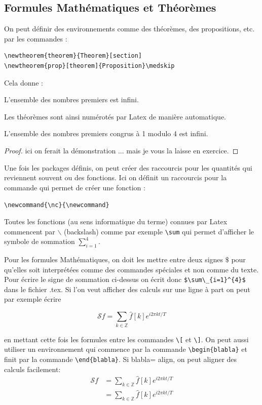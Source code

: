\documentclass[a4paper,10pt]{article}
\begin{document}
\subsection{Formules Mathématiques et Théorèmes}
On peut définir des environnements comme des théorèmes, des propositions, etc. par les commandes :\medskip
\begin{lstlisting}
\newtheorem{theorem}{Theorem}[section] 
\newtheorem{prop}[theorem]{Proposition}\medskip
\end{lstlisting}
Cela donne :

\begin{theorem}
 L'ensemble des nombres premiers est infini.
\end{theorem}
Les théorèmes  sont ainsi numérotés par Latex de manière automatique.

\begin{theorem}
 L'ensemble des nombres premiers congrus à 1 modulo 4 est infini.
\end{theorem}

\begin{proof}
 ici on ferait la démonstration ... mais  je vous la laisse en exercice.
\end{proof}



Une fois les packages définis, on peut créer des raccourcis pour les quantités qui reviennent souvent ou des fonctions. Ici on définit un raccourcis pour la commande qui permet de créer une fonction :\medskip

\lstinline+\newcommand{\nc}{\newcommand}+

\begin{rem}
 Toutes les fonctions (au sens informatique du terme) connues par Latex commencent par $\backslash$ (backslash) comme par exemple \lstinline+\sum+
 qui permet d'afficher le symbole de sommation $\sum_{i=1}^{4}$. 
\end{rem}


Pour les formules Mathématiques, on doit  les mettre entre deux signes 
$\$$ pour qu'elles soit interprétées comme des commandes spéciales et non comme du texte. 
Pour écrire le signe de sommation ci-dessus on écrit donc \lstinline+$\sum\_{i=1}^{4}$+ dans le fichier .tex. Si l'on veut afficher des calculs sur une ligne à part on peut par exemple écrire 

\[\mathcal{S}f = \sum_{k\in\mathbb{Z}} \hat f[k] e^{i2\pi kt/T} \] 

en mettant cette fois les formules  entre  les commandes 
\lstinline+\[+ et \lstinline+\]+. On peut aussi utiliser un environnement qui commence par la commande 
\lstinline+\begin{blabla}+ et finit par la commande \lstinline+\end{blabla}+. Si blabla= align, 
on peut aligner des calculs facilement:
\begin{align}
 \mathcal{S}f & = \sum_{k\in\mathbb{Z}} \hat f[k] e^{i2\pi kt/T} \label{nomformule}\\
  & = \sum_{k\in\mathbb{Z}} \hat f[k] e^{i2\pi kt/T}
\end{align}
\end{document}
